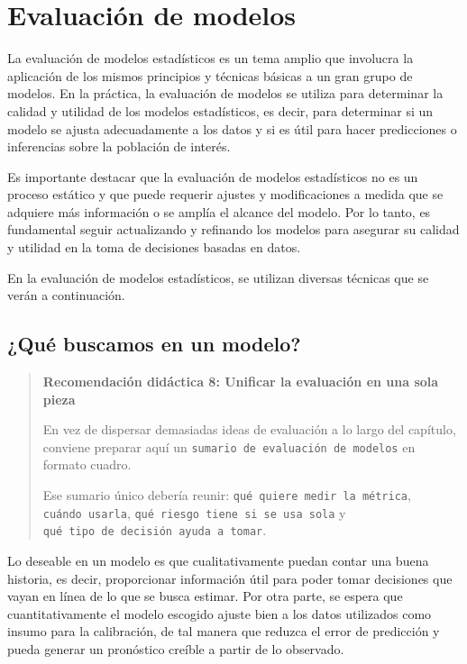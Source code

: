 \documentclass[
]{book}
\begin{document}
\hypertarget{evaluaciuxf3n-de-modelos-1}{%
\section{Evaluación de modelos}\label{evaluaciuxf3n-de-modelos-1}}

La evaluación de modelos estadísticos es un tema amplio que involucra la
aplicación de los mismos principios y técnicas básicas a un gran grupo
de modelos. En la práctica, la evaluación de modelos se utiliza para
determinar la calidad y utilidad de los modelos estadísticos, es decir,
para determinar si un modelo se ajusta adecuadamente a los datos y si es
útil para hacer predicciones o inferencias sobre la población de
interés.

Es importante destacar que la evaluación de modelos estadísticos no es
un proceso estático y que puede requerir ajustes y modificaciones a
medida que se adquiere más información o se amplía el alcance del
modelo. Por lo tanto, es fundamental seguir actualizando y refinando los
modelos para asegurar su calidad y utilidad en la toma de decisiones
basadas en datos.

En la evaluación de modelos estadísticos, se utilizan diversas técnicas
que se verán a continuación.

\hypertarget{quuxe9-buscamos-en-un-modelo-1}{%
\subsection{¿Qué buscamos en un modelo?}\label{quuxe9-buscamos-en-un-modelo-1}}

\begin{quote}
\textbf{Recomendación didáctica 8: Unificar la evaluación en una sola pieza}

En vez de dispersar demasiadas ideas de evaluación a lo largo del
capítulo, conviene preparar aquí un \texttt{sumario\ de\ evaluación\ de\ modelos}
en formato cuadro.

Ese sumario único debería reunir: \texttt{qué\ quiere\ medir\ la\ métrica},
\texttt{cuándo\ usarla}, \texttt{qué\ riesgo\ tiene\ si\ se\ usa\ sola} y \texttt{qué\ tipo\ de\ decisión\ ayuda\ a\ tomar}.
\end{quote}

Lo deseable en un modelo es que cualitativamente puedan contar una buena
historia, es decir, proporcionar información útil para poder tomar
decisiones que vayan en línea de lo que se busca estimar. Por otra
parte, se espera que cuantitativamente el modelo escogido ajuste bien a
los datos utilizados como insumo para la calibración, de tal manera que
reduzca el error de predicción y pueda generar un pronóstico creíble a
partir de lo observado.
\end{document}
